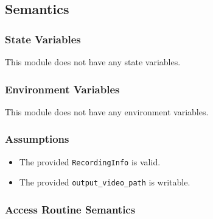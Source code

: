 \documentclass[12pt, titlepage]{article}
\begin{document}
\subsection{Semantics}

\subsubsection{State Variables}

This module does not have any state variables.

\subsubsection{Environment Variables}

This module does not have any environment variables.

\subsubsection{Assumptions}

\begin{itemize}
  \item The provided \texttt{RecordingInfo} is valid.
  \item The provided \texttt{output\_video\_path} is writable.
\end{itemize}

\subsubsection{Access Routine Semantics}
\end{document}
